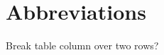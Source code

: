 
\newpage
\setcounter{secnumdepth}{0}
\section{Abbreviations}
\begin{itemize*}
     \item{} Break table column over two rows?
\end{itemize*}

